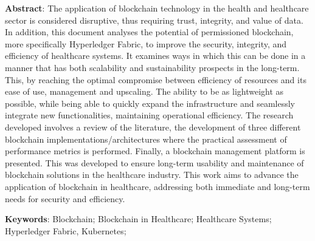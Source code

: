\textbf{Abstract}: The application of blockchain technology in the health and healthcare sector is considered disruptive, thus requiring trust, integrity, and value of data. In addition, this document analyses the potential of permissioned blockchain, more specifically Hyperledger Fabric, to improve the security, integrity, and efficiency of healthcare systems. It examines ways in which this can be done in a manner that has both scalability and sustainability prospects in the long-term. This, by reaching the optimal compromise between efficiency of resources and its ease of use, management and upscaling. The ability to be as lightweight as possible, while being able to quickly expand the infrastructure and seamlessly integrate new functionalities, maintaining operational efficiency. 
The research developed involves a review of the literature, the development of three different blockchain implementations/architectures where the practical assessment of performance metrics is performed. Finally, a blockchain management platform is presented. This was developed to ensure long-term usability and maintenance of blockchain solutions in the healthcare industry.
This work aims to advance the application of blockchain in healthcare, addressing both immediate and long-term needs for security and efficiency.


\textbf{Keywords}: Blockchain; Blockchain in Healthcare; Healthcare Systems; Hyperledger Fabric, Kubernetes;

\newpage